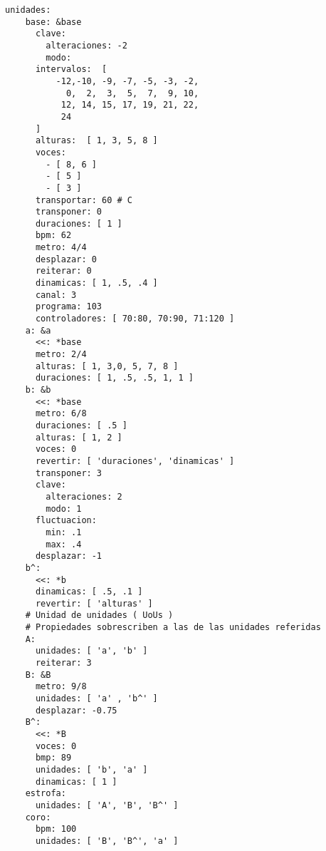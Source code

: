 \begin{itemize}
\begin{verbatim}
unidades:
    base: &base 
      clave:
        alteraciones: -2
        modo:
      intervalos:  [ 
          -12,-10, -9, -7, -5, -3, -2,
            0,  2,  3,  5,  7,  9, 10,
           12, 14, 15, 17, 19, 21, 22,
           24
      ]
      alturas:  [ 1, 3, 5, 8 ] 
      voces: 
        - [ 8, 6 ] 
        - [ 5 ] 
        - [ 3 ]
      transportar: 60 # C
      transponer: 0
      duraciones: [ 1 ]
      bpm: 62
      metro: 4/4
      desplazar: 0
      reiterar: 0
      dinamicas: [ 1, .5, .4 ]
      canal: 3
      programa: 103
      controladores: [ 70:80, 70:90, 71:120 ]
    a: &a 
      <<: *base
      metro: 2/4
      alturas: [ 1, 3,0, 5, 7, 8 ]
      duraciones: [ 1, .5, .5, 1, 1 ]
    b: &b 
      <<: *base
      metro: 6/8
      duraciones: [ .5 ]
      alturas: [ 1, 2 ]
      voces: 0
      revertir: [ 'duraciones', 'dinamicas' ]
      transponer: 3
      clave: 
        alteraciones: 2
        modo: 1 
      fluctuacion: 
        min: .1
        max: .4 
      desplazar: -1
    b^: 
      <<: *b
      dinamicas: [ .5, .1 ]
      revertir: [ 'alturas' ]
    # Unidad de unidades ( UoUs )
    # Propiedades sobrescriben a las de las unidades referidas 
    A: 
      unidades: [ 'a', 'b' ] 
      reiterar: 3
    B: &B 
      metro: 9/8
      unidades: [ 'a' , 'b^' ]
      desplazar: -0.75
    B^: 
      <<: *B
      voces: 0 
      bmp: 89
      unidades: [ 'b', 'a' ] 
      dinamicas: [ 1 ]
    estrofa: 
      unidades: [ 'A', 'B', 'B^' ]
    coro: 
      bpm: 100
      unidades: [ 'B', 'B^', 'a' ]

\end{verbatim}


\end{itemize}
\setlength{\parskip}{6pt plus 2pt minus 1pt}